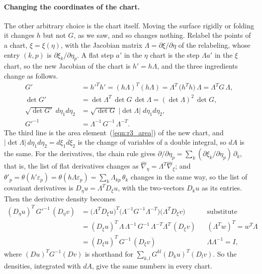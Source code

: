 \paragraph{Changing the coordinates of the chart.} The other arbitrary choice is the chart itself. Moving the surface rigidly or folding it changes $h$ but not $G$, as we saw, and so changes nothing. Relabel the points of a chart, $\xi = \xi(\eta)$, with the Jacobian matrix $\Lambda = \partial\xi/\partial\eta$ of the relabeling, whose entry $(k, p)$ is $\partial\xi_k/\partial\eta_p$. A flat step $a'$ in the $\eta$ chart is the step $\Lambda a'$ in the $\xi$ chart, so the new Jacobian of the chart is $h' = h\Lambda$, and the three ingredients change as follows.
\begin{align*}
G' &= h'^T h' = (h\Lambda)^T(h\Lambda) = \Lambda^T\,\big(h^T h\big)\, \Lambda = \Lambda^T G\, \Lambda , \\
\det G' &= \det \Lambda^T\,\det G\,\det \Lambda = (\det \Lambda)^2\,\det G , \\
\sqrt{\det G'}\; d\eta_1 d\eta_2 &= \sqrt{\det G}\;|\det \Lambda|\; d\eta_1 d\eta_2 , \\
{G'}^{-1} &= \Lambda^{-1}\, G^{-1}\, \Lambda^{-T} .
\end{align*}
The third line is the area element~(\ref{eqn:r3_area}) of the new chart, and $|\det \Lambda|\, d\eta_1 d\eta_2 = d\xi_1 d\xi_2$ is the change of variables of a double integral, so $dA$ is the same. For the derivatives, the chain rule gives $\partial/\partial\eta_p = \sum_k (\partial\xi_k/\partial\eta_p)\,\partial_k$, that is, the list of flat derivatives changes as $\hat\nabla_\eta = \Lambda^T\hat\nabla_\xi$; and $\theta'_p = \theta(h'\varepsilon_p) = \theta(h\Lambda\varepsilon_p) = \sum_k \Lambda_{kp}\,\theta_k$ changes in the same way, so the list of covariant derivatives is $D_\eta u = \Lambda^T D_\xi u$, with the two-vectors $D_ku$ as its entries. Then the derivative density becomes
\begin{align*}
(D_\eta u)^T\, {G'}^{-1}\, (D_\eta v) &= \big(\Lambda^T D_\xi u\big)^T\big(\Lambda^{-1} G^{-1} \Lambda^{-T}\big)\big(\Lambda^T D_\xi v\big) && \text{substitute} \\
&= (D_\xi u)^T\, \Lambda\, \Lambda^{-1}\, G^{-1}\, \Lambda^{-T} \Lambda^T\, (D_\xi v) && (\Lambda^Tw)^T = w^T\Lambda \\
&= (D_\xi u)^T\, G^{-1}\, (D_\xi v) && \Lambda\Lambda^{-1} = I ,
\end{align*}
where $(Du)^T G^{-1}(Dv)$ is shorthand for $\sum_{k,l} G^{kl}(D_ku)^T(D_lv)$. So the densities, integrated with $dA$, give the same numbers in every chart.

